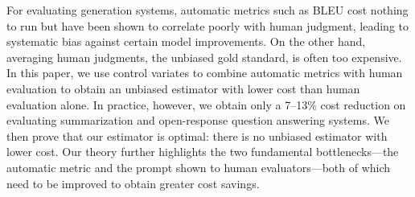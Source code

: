 For evaluating generation systems, automatic metrics such as BLEU cost nothing to run but have been shown to correlate poorly with human judgment, leading to systematic bias against certain model improvements.
On the other hand, averaging human judgments, the unbiased gold standard, is often too expensive.
In this paper, we use control variates to combine automatic metrics with human evaluation to
obtain an unbiased estimator with lower cost than human evaluation alone.
In practice, however, we obtain only a 7--13\% cost reduction on evaluating summarization and open-response question answering systems.
We then prove that our estimator is optimal: there is no unbiased estimator with lower cost.
Our theory further highlights the two fundamental bottlenecks---the automatic
metric and the prompt shown to human evaluators---both of which need to be improved to obtain greater cost savings.



